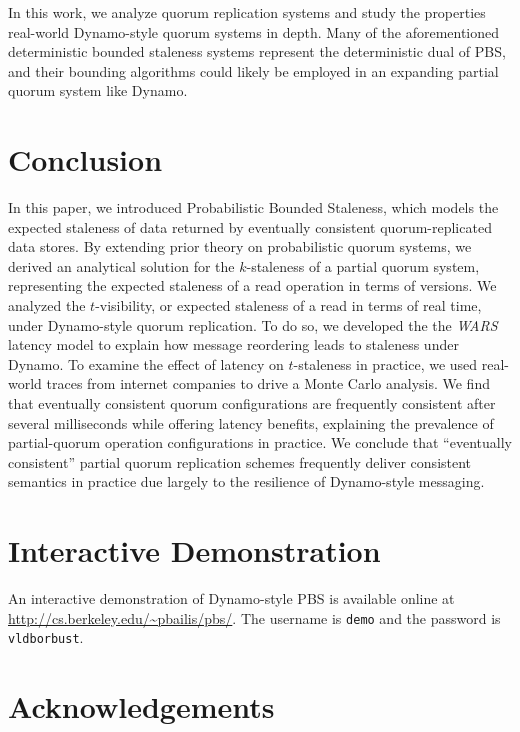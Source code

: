 \documentclass{vldb}
\newcommand{\sectionskip}{-0em}
\begin{document}
In this work, we analyze quorum replication systems and study the
properties real-world Dynamo-style quorum systems in depth.  Many of
the aforementioned deterministic bounded staleness systems represent the
deterministic dual of PBS, and their bounding algorithms could likely
be employed in an expanding partial quorum system like Dynamo.

\vspace{\sectionskip}\section{Conclusion}
\label{sec:conclusion}

In this paper, we introduced Probabilistic Bounded Staleness, which
models the expected staleness of data returned by eventually
consistent quorum-replicated data stores.  By extending prior theory
on probabilistic quorum systems, we derived an analytical solution for
the $k$-staleness of a partial quorum system, representing the
expected staleness of a read operation in terms of versions.  We
analyzed the $t$-visibility, or expected staleness of a read in terms
of real time, under Dynamo-style quorum replication.  To do so, we
developed the the \textit{WARS} latency model to explain how message
reordering leads to staleness under Dynamo.  To examine the effect of
latency on $t$-staleness in practice, we used real-world traces from
internet companies to drive a Monte Carlo analysis.  We find that
eventually consistent quorum configurations are frequently consistent
after several milliseconds while offering latency benefits, explaining
the prevalence of partial-quorum operation configurations in practice.
We conclude that ``eventually consistent'' partial quorum replication
schemes frequently deliver consistent semantics in practice due
largely to the resilience of Dynamo-style messaging.

\section*{Interactive Demonstration}

An interactive demonstration of Dynamo-style PBS is available online at \url{http://cs.berkeley.edu/~pbailis/pbs/}.  The username is \texttt{demo} and the password is \texttt{vldborbust}.

\section*{Acknowledgements}
\end{document}
